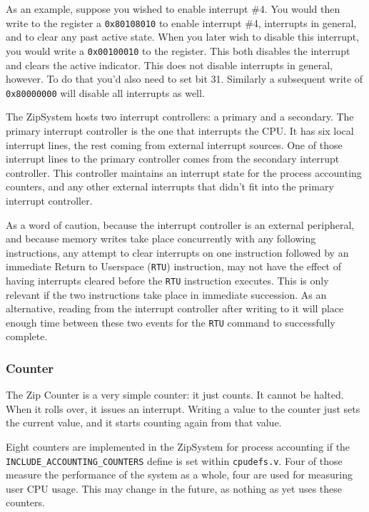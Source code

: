 \documentclass{gqtekspec}
\begin{document}
As an example, suppose you wished to enable interrupt \#4.  You would then
write to the register a {\tt 0x80108010} to enable interrupt \#4, interrupts
in general, and to clear any past active state.  When you later wish to disable
this interrupt, you would write a {\tt 0x00100010} to the register.  This both
disables the interrupt and clears the active indicator.  This does not
disable interrupts in general, however.  To do that you'd also need to set
bit 31.  Similarly a subsequent write of {\tt 0x80000000} will disable all
interrupts as well.

The ZipSystem hosts two interrupt controllers: a primary and a secondary.  The
primary interrupt controller is the one that interrupts the CPU.  It has
six local interrupt lines, the rest coming from external interrupt sources.
One of those interrupt lines to the primary controller comes from the secondary
interrupt controller.  This controller maintains an interrupt state for the
process accounting counters, and any other external interrupts that didn't fit
into the primary interrupt controller.

As a word of caution, because the interrupt controller is an external
peripheral, and because memory writes take place concurrently with any following
instructions, any attempt to clear interrupts on one instruction followed by
an immediate Return to Userspace ({\tt RTU}) instruction, may not have the
effect of having interrupts cleared before the {\tt RTU} instruction executes.
This is only relevant if the two instructions take place in immediate
succession.  As an alternative, reading from the interrupt controller after
writing to it will place enough time between these two events for the
{\tt RTU} command to successfully complete.

\subsubsection{Counter}

The Zip Counter is a very simple counter: it just counts.  It cannot be
halted.  When it rolls over, it issues an interrupt.  Writing a value to the
counter just sets the current value, and it starts counting again from that
value.

Eight counters are implemented in the ZipSystem for process accounting if
the {\tt INCLUDE\_ACCOUNTING\_COUNTERS} define is set within {\tt cpudefs.v}.
Four of those measure the performance of the system as a whole, four are
used for measuring user CPU usage.
This may change in the future, as nothing as yet uses these counters.
\end{document}
